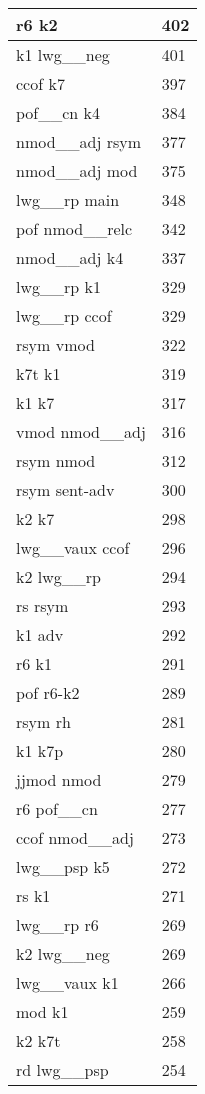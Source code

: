 \documentclass[a4 paper]{article}
\begin{document}
\begin{longtable}{p{}p{}}
r6 k2  & 402 \\ \midrule
k1 lwg\_\_neg  & 401 \\ \midrule
ccof k7  & 397 \\ \midrule
pof\_\_cn k4  & 384 \\ \midrule
nmod\_\_adj rsym  & 377 \\ \midrule
nmod\_\_adj mod  & 375 \\ \midrule
lwg\_\_rp main  & 348 \\ \midrule
pof nmod\_\_relc  & 342 \\ \midrule
nmod\_\_adj k4  & 337 \\ \midrule
lwg\_\_rp k1  & 329 \\ \midrule
lwg\_\_rp ccof  & 329 \\ \midrule
rsym vmod  & 322 \\ \midrule
k7t k1  & 319 \\ \midrule
k1 k7  & 317 \\ \midrule
vmod nmod\_\_adj  & 316 \\ \midrule
rsym nmod  & 312 \\ \midrule
rsym sent-adv  & 300 \\ \midrule
k2 k7  & 298 \\ \midrule
lwg\_\_vaux ccof  & 296 \\ \midrule
k2 lwg\_\_rp  & 294 \\ \midrule
rs rsym  & 293 \\ \midrule
k1 adv  & 292 \\ \midrule
r6 k1  & 291 \\ \midrule
pof r6-k2  & 289 \\ \midrule
rsym rh  & 281 \\ \midrule
k1 k7p  & 280 \\ \midrule
jjmod nmod  & 279 \\ \midrule
r6 pof\_\_cn  & 277 \\ \midrule
ccof nmod\_\_adj  & 273 \\ \midrule
lwg\_\_psp k5  & 272 \\ \midrule
rs k1  & 271 \\ \midrule
lwg\_\_rp r6  & 269 \\ \midrule
k2 lwg\_\_neg  & 269 \\ \midrule
lwg\_\_vaux k1  & 266 \\ \midrule
mod k1  & 259 \\ \midrule
k2 k7t  & 258 \\ \midrule
rd lwg\_\_psp  & 254 \\ \midrule

\end{longtable}
\end{document}
